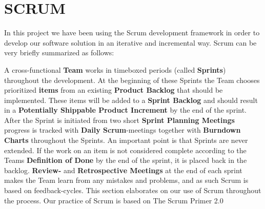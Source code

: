 \section{SCRUM}

In this project we have been using the Scrum development framework in order to develop our software solution in an iterative and incremental way. Scrum can be very briefly summarized as follows:

A cross-functional \textbf{Team} works in timeboxed periods (called \textbf{Sprints}) throughout the development. At the beginning of these Sprints the Team chooses prioritized \textbf{items} from an existing \textbf{Product Backlog} that should be implemented. These items will be added to a \textbf{Sprint Backlog} and should result in a \textbf{ Potentially Shippable Product Increment} by the end of the sprint.
After the Sprint is initiated from two short \textbf{Sprint Planning Meetings} progress is tracked with \textbf{Daily Scrum}-meetings together with \textbf{Burndown Charts} throughout the Sprints. An important point is that Sprints are never extended. If the work on an item is not considered complete according to the Teams \textbf{Definition of Done} by the end of the sprint, it is placed back in the backlog.
\textbf{Review-} and \textbf{Retrospective Meetings} at the end of each sprint makes the Team learn from any mistakes and problems, and as such Scrum is based on feedback-cycles.
This section elaborates on our use of Scrum throughout the process. Our practice of Scrum is based on The Scrum Primer 2.0 \cite{ScrumPrimer2}







